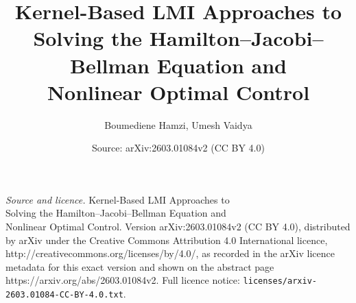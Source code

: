 \documentclass[10pt,a4paper]{amsart}
\title{Kernel-Based LMI Approaches to \\ Solving the Hamilton–Jacobi–Bellman Equation and \\ Nonlinear Optimal Control}
\author{Boumediene Hamzi, Umesh Vaidya}
\date{Source: arXiv:2603.01084v2 (CC BY 4.0)}
\begin{document}
\maketitle

\noindent\emph{Source and licence.} Kernel-Based LMI Approaches to \\ Solving the Hamilton–Jacobi–Bellman Equation and \\ Nonlinear Optimal Control. Version arXiv:2603.01084v2 (CC BY 4.0), distributed by arXiv under the Creative Commons Attribution 4.0 International licence, http://creativecommons.org/licenses/by/4.0/, as recorded in the arXiv licence metadata for this exact version and shown on the abstract page https://arxiv.org/abs/2603.01084v2. Full licence notice: \texttt{licenses/arxiv-2603.01084-CC-BY-4.0.txt}.\par\smallskip
\end{document}
